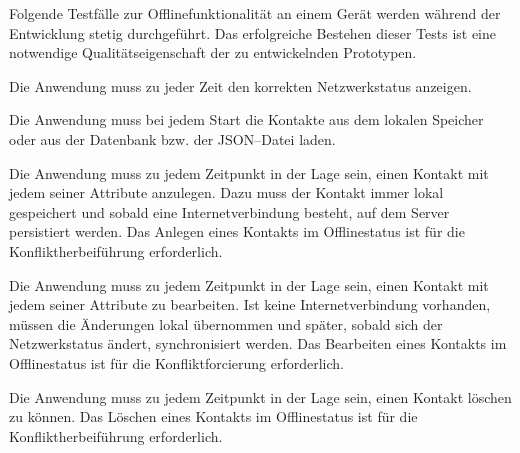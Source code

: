 Folgende Testfälle zur Offlinefunktionalität an einem Gerät werden während der Entwicklung stetig durchgeführt.
Das erfolgreiche Bestehen dieser Tests ist eine notwendige Qualitätseigenschaft der zu entwickelnden Prototypen.
\begin{description}[leftmargin=0.7cm,style=nextline]
%
\item[Netzwerkstatus:] 
Die Anwendung muss zu jeder Zeit den korrekten Netzwerkstatus anzeigen.\\
\item[Kontakte lesen:] 
Die Anwendung muss bei jedem Start die Kontakte aus dem lokalen Speicher oder aus der Datenbank bzw. der \gls{JSON}--Datei laden.\\
%
\item[Kontakt anlegen:] 
Die Anwendung muss zu jedem Zeitpunkt in der Lage sein, einen Kontakt mit jedem seiner Attribute anzulegen.
Dazu muss der Kontakt immer lokal gespeichert und sobald eine Internetverbindung besteht, auf dem Server persistiert werden.
Das Anlegen eines Kontakts im Offlinestatus ist für die Konfliktherbeiführung erforderlich.\\
%
\item[Kontakt bearbeiten:] 
Die Anwendung muss zu jedem Zeitpunkt in der Lage sein, einen Kontakt mit jedem seiner Attribute zu bearbeiten.
Ist keine Internetverbindung vorhanden, müssen die Änderungen lokal übernommen und später, sobald sich der Netzwerkstatus ändert, synchronisiert werden.
Das Bearbeiten eines Kontakts im Offlinestatus ist für die Konfliktforcierung erforderlich.\\
%
\item[Kontakt löschen:] 
Die Anwendung muss zu jedem Zeitpunkt in der Lage sein, einen Kontakt löschen zu können.
Das Löschen eines Kontakts im Offlinestatus ist für die Konfliktherbeiführung erforderlich.
\end{description}